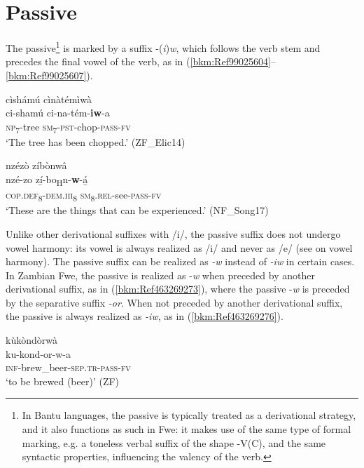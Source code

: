 \largerpage
\section{Passive}
\label{bkm:Ref452972446}\hypertarget{Toc75352658}{}
The passive\footnote{In Bantu languages, the passive is typically treated as a derivational strategy, and it also functions as such in Fwe: it makes use of the same type of formal marking, e.g. a toneless verbal suffix of the shape -V(C), and the same syntactic properties, influencing the valency of the verb.}  is marked by a suffix -(\textit{i})\textit{w}, which follows the verb stem and precedes the final vowel of the verb, as in (\ref{bkm:Ref99025604}--\ref{bkm:Ref99025607}).

\ea
\label{bkm:Ref99025604}
cìshámú cìnàtémìwà\\
\gll ci-shamú  ci-na-tém-\textbf{iw}-a\\
\textsc{np}\textsubscript{7}-tree  \textsc{sm}\textsubscript{7}-\textsc{pst}-chop-\textsc{pass}-\textsc{fv}\\
\glt ‘The tree has been chopped.’ (ZF\_Elic14)
\z

\ea
\label{bkm:Ref99025607}
nzézò zíbònwâ\\
\gll nzé-zo    zí̲-bo\textsubscript{H}n-\textbf{w}-á̲\\
\textsc{cop}.\textsc{def}\textsubscript{8}-\textsc{dem}.\textsc{iii}\textsubscript{8}  \textsc{sm}\textsubscript{8}.\textsc{rel}-see-\textsc{pass}-\textsc{fv}\\
\glt ‘These are the things that can be experienced.’ (NF\_Song17)
\z

Unlike other derivational suffixes with /i/, the passive suffix does not undergo vowel harmony: its vowel is always realized as /i/ and never as /e/ (see  on vowel harmony). The passive suffix can be realized as \textit{-w} instead of \textit{-iw} in certain cases. In Zambian Fwe, the passive is realized as -\textit{w} when preceded by another derivational suffix, as in (\ref{bkm:Ref463269273}), where the passive -\textit{w} is preceded by the separative suffix \textit{-or}. When not preceded by another derivational suffix, the passive is always realized as \textit{-iw}, as in (\ref{bkm:Ref463269276}).

\ea
\label{bkm:Ref463269273}
\glll kùkòndòrwà\\
ku-kond-or-w-a\\
\textsc{inf}-brew\_beer-\textsc{sep}.\textsc{tr}-\textsc{pass}-\textsc{fv}\\
\glt ‘to be brewed (beer)’ (ZF)
\z

